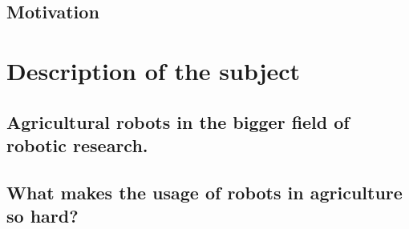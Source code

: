    




    
   




    \section{Motivation}
    

    \chapter{Description of the subject}
        \section{Agricultural robots in the bigger field of robotic research.}

        \section{What makes the usage of robots in agriculture so hard?}

